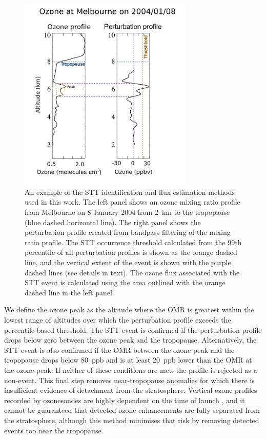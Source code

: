 \documentclass[acp, manuscript]{copernicus} %
\begin{document}
    \begin{figure}[t]
      \includegraphics[width=8.3cm]{figures/filtereg.png}
      \caption{ %
	An example of the STT identification and flux estimation methods used in this work. 
	The left panel shows an ozone mixing ratio profile from Melbourne on 8 January 2004 from 2~km to the tropopause (blue dashed horizontal line).
	The right panel shows the perturbation profile created from bandpass filtering of the mixing ratio profile. The STT occurrence threshold calculated from the 99th percentile of all perturbation profiles is shown as the orange dashed line, and the vertical extent of the event is shown with the purple dashed lines (see details in text).
	The ozone flux associated with the STT event is calculated using the area outlined with the orange dashed line in the left panel.
      }
      \label{fig:filterEG}
    \end{figure}

    We define the ozone peak as the altitude where the OMR is greatest within the lowest range of altitudes over which the perturbation profile exceeds the percentile-based threshold.
    The STT event is confirmed if the perturbation profile drops below zero between the ozone peak and the tropopause. 
    Alternatively, the STT event is also confirmed if the OMR between the ozone peak and the tropopause drops below 80~ppb and is at least 20~ppb lower than the OMR at the ozone peak. 
    If neither of these conditions are met, the profile is rejected as a non-event.
    This final step removes near-tropopause anomalies for which there is insufficient evidence of detachment from the stratosphere.
    Vertical ozone profiles recorded by ozonesondes are highly dependent on the time of launch \citep{Sprenger2003}, and it cannot be guaranteed that detected ozone enhancements are fully separated from the stratosphere, although this method minimises that risk by removing detected events too near the tropopause.
\end{document}

